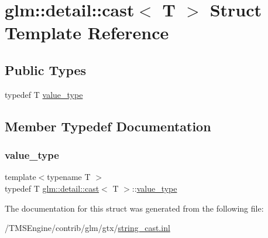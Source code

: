 \hypertarget{structglm_1_1detail_1_1cast}{}\section{glm\+:\+:detail\+:\+:cast$<$ T $>$ Struct Template Reference}
\label{structglm_1_1detail_1_1cast}
\subsection*{Public Types}
\begin{DoxyCompactItemize}
\item 
typedef T \hyperlink{structglm_1_1detail_1_1cast_aee0fcb3ea7c887fbc9fbe700a8b758b7}{value\+\_\+type}
\end{DoxyCompactItemize}


\subsection{Member Typedef Documentation}
\mbox{\label{structglm_1_1detail_1_1cast_aee0fcb3ea7c887fbc9fbe700a8b758b7}} 
\subsubsection{\texorpdfstring{value\+\_\+type}{value\_type}}
{\footnotesize\ttfamily template$<$typename T $>$ \\
typedef T \hyperlink{structglm_1_1detail_1_1cast}{glm\+::detail\+::cast}$<$ T $>$\+::\hyperlink{structglm_1_1detail_1_1cast_aee0fcb3ea7c887fbc9fbe700a8b758b7}{value\+\_\+type}}



The documentation for this struct was generated from the following file\+:\begin{DoxyCompactItemize}
\item 
/\+T\+M\+S\+Engine/contrib/glm/gtx/\hyperlink{string__cast_8inl}{string\+\_\+cast.\+inl}\end{DoxyCompactItemize}
